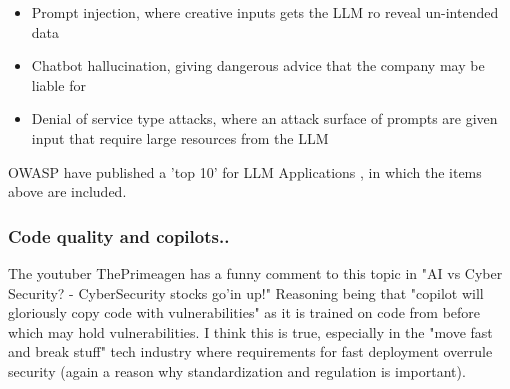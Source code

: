 \documentclass[
	letterpaper, %
	10pt, %
	unnumberedsections, %
	twoside, %
]{APAAssignment}
\begin{document}
\begin{itemize}
	\item Prompt injection, where creative inputs gets the LLM ro reveal un-intended data  
	\item Chatbot hallucination, giving dangerous advice that the company may be liable for
	\item Denial of service type attacks, where an attack surface of prompts are given input that require large resources from the LLM  
\end{itemize}

OWASP have published a 'top 10' for LLM Applications \cite{OWASP-Top10-LLM}, in which the items above are included.

\subsubsection{Code quality and copilots..} The youtuber ThePrimeagen has a funny comment to this topic in \cite{ThePrimaegenCyberStocksUp} "AI vs Cyber Security? - CyberSecurity stocks go'in up!" Reasoning being that "copilot will gloriously copy code with vulnerabilities" as it is trained on code from before which may hold vulnerabilities. I think this is true, especially in the "move fast and break stuff" tech industry where requirements for fast deployment overrule security (again a reason why standardization and regulation is important).    




\clearpage
\printbibliography %




\end{document}
